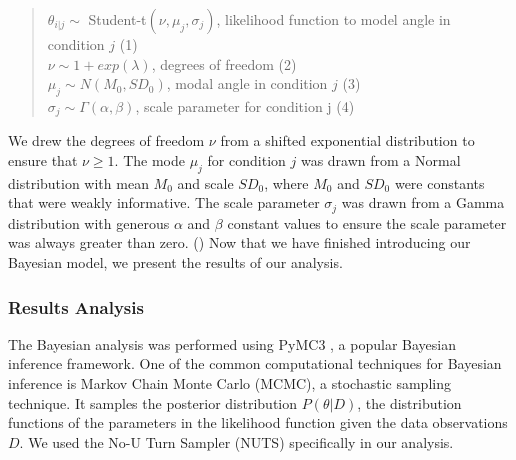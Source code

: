 \begin{quote}
    $\theta_{i|j} \sim$ Student-t$(\nu, \mu_j, \sigma_j)$, \hfill likelihood function to model angle in condition $j$ (1) \\
    $\nu \sim 1 + exp(\lambda)$, \hfill degrees of freedom (2) \\
    $\mu_j \sim N(M_0, SD_0)$, \hfill modal angle in condition $j$ (3) \\
    $\sigma_j \sim \Gamma(\alpha, \beta)$, \hfill scale parameter for condition j (4)
\end{quote}

We drew the degrees of freedom $\nu$ 
from a shifted exponential distribution 
to ensure that $\nu \geq 1$. 
The mode $\mu_j$ for condition $j$ was drawn 
from a Normal distribution 
with mean $M_0$ and scale $SD_0$, 
where $M_0$ and $SD_0$ were constants that were weakly informative. 
The scale parameter $\sigma_j$ was drawn from a Gamma distribution 
with generous $\alpha$ and $\beta$ constant values 
to ensure the scale parameter was always greater than zero. ()
Now that we have finished introducing our Bayesian model, 
we present the results of our analysis.

\subsubsection{Results Analysis}
    

The Bayesian analysis was performed using PyMC3 \cite{salvatier2016probabilistic}, 
a popular Bayesian inference framework. 
One of the common computational techniques 
for Bayesian inference is Markov Chain Monte Carlo (MCMC), 
a stochastic sampling technique. 
It samples the posterior distribution $P(\theta | D)$, 
the distribution functions of the parameters 
in the likelihood function given the data observations $D$. 
We used the No-U Turn Sampler (NUTS) specifically 
in our analysis. 

